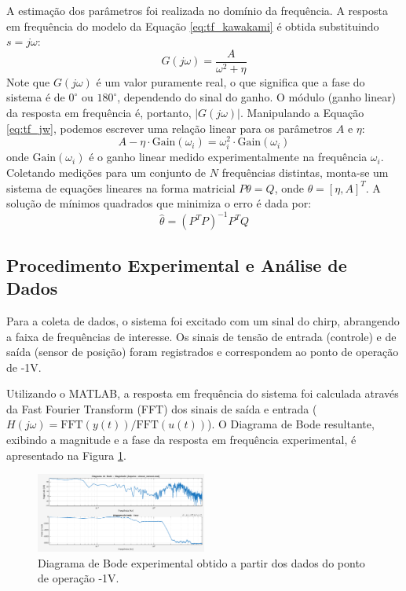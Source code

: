 A estimação dos parâmetros foi realizada no domínio da frequência. A resposta em frequência do modelo da Equação \ref{eq:tf_kawakami} é obtida substituindo $s = j\omega$:
\begin{equation}
    G(j\omega) = \frac{A}{\omega^2 + \eta}
    \label{eq:tf_jw}
\end{equation}
Note que $G(j\omega)$ é um valor puramente real, o que significa que a fase do sistema é de $0^\circ$ ou $180^\circ$, dependendo do sinal do ganho. O módulo (ganho linear) da resposta em frequência é, portanto, $|G(j\omega)|$. Manipulando a Equação \ref{eq:tf_jw}, podemos escrever uma relação linear para os parâmetros $A$ e $\eta$: 
\begin{equation}
    A - \eta \cdot \text{Gain}(\omega_i) = \omega_i^2 \cdot \text{Gain}(\omega_i)
    \label{eq:mq_linear}
\end{equation}
onde $\text{Gain}(\omega_i)$ é o ganho linear medido experimentalmente na frequência $\omega_i$. Coletando medições para um conjunto de $N$ frequências distintas, monta-se um sistema de equações lineares na forma matricial $P\theta = Q$, onde $\theta = [\eta, A]^T$. A solução de mínimos quadrados que minimiza o erro é dada por:
\begin{equation}
    \hat{\theta} = (P^T P)^{-1} P^T Q
\end{equation}

\subsection{Procedimento Experimental e Análise de Dados}

Para a coleta de dados, o sistema foi excitado com um sinal do chirp, abrangendo a faixa de frequências de interesse. Os sinais de tensão de entrada (controle) e de saída (sensor de posição) foram registrados e correspondem ao ponto de operação de -1V.

Utilizando o MATLAB, a resposta em frequência do sistema foi calculada através da Fast Fourier Transform (FFT) dos sinais de saída e entrada ($H(j\omega) = \text{FFT}(y(t)) / \text{FFT}(u(t))$). O Diagrama de Bode resultante, exibindo a magnitude e a fase da resposta em frequência experimental, é apresentado na Figura \ref{fig:bode}.

\begin{figure}[ht!]
    \centering
    \includegraphics[width=0.5\textwidth]{bode_plot.png} %
    \caption{Diagrama de Bode experimental obtido a partir dos dados do ponto de operação -1V.}
    \label{fig:bode}
\end{figure}


